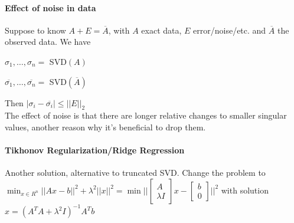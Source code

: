 \documentclass[10pt]{report}
\begin{document}
\paragraph{Effect of noise in data} Suppose to know $A+E = \overline{A}$, with $A$ exact data, $E$ error/noise/etc. and $\overline{A}$ the observed data. We have
\begin{list}{}{}
	\item $\sigma_1,\ldots,\sigma_n =$ SVD$(A)$
	\item $\overline{\sigma_1},\ldots,\overline{\sigma_n} =$ SVD$(\overline{A})$
\end{list}
Then $|\sigma_i - \overline{\sigma_i}| \leq ||E||_2$\\
The effect of noise is that there are longer relative changes to smaller singular values, another reason why it's beneficial to drop them.
\paragraph{Tikhonov Regularization/Ridge Regression} Another solution, alternative to truncated SVD. Change the problem to $\min_{x\in R^n} ||Ax-b||^2 + \lambda^2||x||^2 = \min||\left[\begin{array}{c}
A\\\lambda I
\end{array}\right]x - \left[\begin{array}{c}
b\\0
\end{array}\right]||^2$ with solution $x = (A^TA+\lambda^2 I)^{-1}A^Tb$
\end{document}
